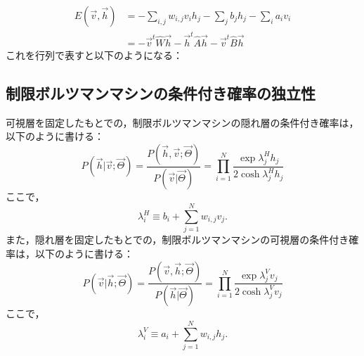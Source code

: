 \begin{align}
     E(\vec{v},\vec{h}) 
    &= -\sum_{i,j}w_{i,j} v_i h_j -\sum_{j} b_{j}h_j  -\sum_{i} a_{i} v_i\\[10pt]
    &=-\Vec{v}^{t}\hat{W}\Vec{h} - \Vec{h}^{t}\hat{A}\Vec{h} - \Vec{v}^{t}\hat{B}\Vec{h}
\end{align}
これを行列で表すと以下のようになる：
\subsection{制限ボルツマンマシンの条件付き確率の独立性}
可視層を固定したもとでの，制限ボルツマンマシンの隠れ層の条件付き確率は，以下のように書ける：
\begin{equation}
    P(\vec{h}|\vec{v};\vec{\Theta}) 
    = \frac{P(\vec{h},\vec{v};\vec{\Theta})}{P(\vec{v}|\vec{\Theta})}
    =\prod_{i=1}^{N} \frac{\exp{\lambda^{H}_j h_j}}{2\cosh{\lambda^{H}_j h_j}}
\end{equation}
ここで，
\begin{equation}
    \lambda^{H}_i \equiv b_i + \sum_{j=1}^{N} w_{i,j} v_j.
\end{equation}
また，隠れ層を固定したもとでの，制限ボルツマンマシンの可視層の条件付き確率は，以下のように書ける：
\begin{equation}
    P(\vec{v}|\vec{h};\vec{\Theta}) 
    = \frac{P(\vec{v},\vec{h};\vec{\Theta})}{P(\vec{h}|\vec{\Theta})}
    =\prod_{i=1}^{N} \frac{\exp{\lambda^{V}_j v_j}}{2\cosh{\lambda^{V}_j v_j}}
\end{equation}
ここで，
\begin{equation}
    \lambda^{V}_i \equiv a_i + \sum_{j=1}^{N} w_{i,j} h_j.
\end{equation}

